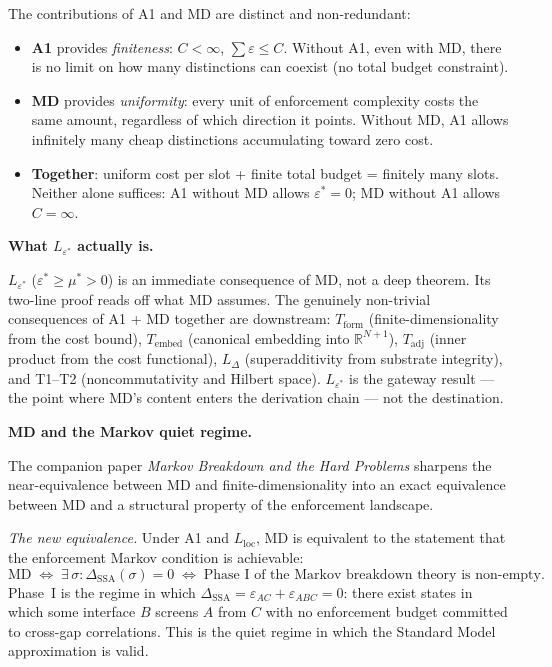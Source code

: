 \documentclass[11pt]{article}
\theoremstyle{remark}
\begin{document}
The contributions of A1 and MD are distinct and non-redundant:
\begin{itemize}[nosep,leftmargin=2em,itemsep=2pt]
\item \textbf{A1} provides \emph{finiteness}: $C < \infty$, $\sum \varepsilon \le C$.  Without A1, even with MD, there is no limit on how many distinctions can coexist (no total budget constraint).
\item \textbf{MD} provides \emph{uniformity}: every unit of enforcement complexity costs the same amount, regardless of which direction it points.  Without MD, A1 allows infinitely many cheap distinctions accumulating toward zero cost.
\item \textbf{Together}: uniform cost per slot + finite total budget = finitely many slots.  Neither alone suffices: A1 without MD allows $\varepsilon^* = 0$; MD without A1 allows $C = \infty$.
\end{itemize}

\medskip\noindent\textbf{What $L_{\varepsilon^*}$ actually is.}

$L_{\varepsilon^*}$ ($\varepsilon^* \ge \mu^* > 0$) is an immediate consequence of MD, not a deep theorem.  Its two-line proof reads off what MD assumes.  The genuinely non-trivial consequences of A1 + MD together are downstream: $T_{\mathrm{form}}$ (finite-dimensionality from the cost bound), $T_{\mathrm{embed}}$ (canonical embedding into $\mathbb{R}^{N+1}$), $T_{\mathrm{adj}}$ (inner product from the cost functional), $L_\Delta$ (superadditivity from substrate integrity), and T1--T2 (noncommutativity and Hilbert space).  $L_{\varepsilon^*}$ is the gateway result --- the point where MD's content enters the derivation chain --- not the destination.




\medskip\noindent\textbf{MD and the Markov quiet regime.}

The companion paper \emph{Markov Breakdown and the Hard Problems} sharpens the
near-equivalence between MD and finite-dimensionality into an exact equivalence
between MD and a structural property of the enforcement landscape.

\smallskip\noindent\textit{The new equivalence.}  Under A1 and
$L_{\mathrm{loc}}$, MD is equivalent to the statement that the enforcement Markov
condition is achievable:
\begin{equation}
  \text{MD}
  \;\Longleftrightarrow\;
  \exists\,\sigma :
  \Delta_{\mathrm{SSA}}(\sigma) = 0
  \;\Longleftrightarrow\;
  \text{Phase~I of the Markov breakdown theory is non-empty.}
  \tag{MD-eq}
\end{equation}
Phase~I is the regime in which $\Delta_{\mathrm{SSA}} = \varepsilon_{AC} +
\varepsilon_{ABC} = 0$: there exist states in which some interface $B$ screens $A$
from $C$ with no enforcement budget committed to cross-gap correlations.  This is
the quiet regime in which the Standard Model approximation is valid.
\end{document}
